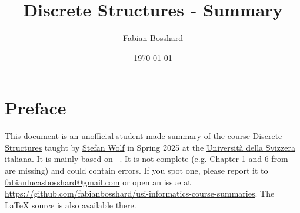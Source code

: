 
\usepackage{caption, subcaption}

\usepackage[backend=biber,style=numeric]{biblatex}



\usepackage[
  pdfauthor={Fabian Bosshard},
  pdftitle={USI - Discrete Structures - Course Summary},
  pdfkeywords={USI, discrete structures, course summary, informatics},
  colorlinks=false,        %
  pdfborder={0 0 0}        %
]{hyperref}
\usepackage[
  type     = {CC},
  modifier = {by},
  version  = {4.0},
]{doclicense}
\usepackage{cleveref}







\title{Discrete Structures - Summary}
\author{Fabian Bosshard}
\date{\today}






\pagestyle{plain}


\maketitle


\tableofcontents







\section*{Preface}

This document is an unofficial student-made summary of the course 
\href{https://search.usi.ch/courses/35270737/discrete-structures}{Discrete Structures} taught by \href{https://search.usi.ch/people/eefbe656c9dfacf0e1a1e15bf8893bcb/wolf-stefan}{Stefan Wolf} in Spring 2025 at the 
\href{https://www.usi.ch/it}{Università della Svizzera italiana}.
It is mainly based on ~\cite{boschini2022}.
It is not complete (e.g. Chapter 1 and 6 from \cite{boschini2022} are missing) and could contain errors.
If you spot one, please report it to \href{mailto:fabianlucasbosshard@gmail.com}{fabianlucasbosshard@gmail.com} or open an issue at \url{https://github.com/fabianbosshard/usi-informatics-course-summaries}.
The \LaTeX{} source is also available there.

